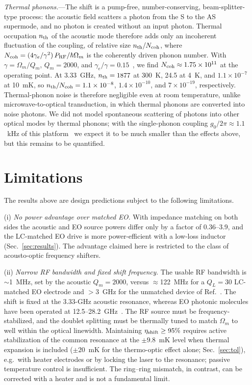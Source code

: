 \documentclass[aps,prapplied,reprint,superscriptaddress,amsmath,amssymb,floatfix]{revtex4-2}
\newcommand{\etash}{\eta_{\rm shift}}
\newcommand{\Pg}{P_{\rm RF}}
\begin{document}
\emph{Thermal phonons.}---The shift is a pump-free, number-conserving, beam-splitter-type process: the acoustic field scatters a photon from the S to the AS supermode, and no photon is created without an input photon. Thermal occupation $n_{\rm th}$ of the acoustic mode therefore adds only an incoherent fluctuation of the coupling, of relative size $n_{\rm th}/N_{\rm coh}$, where $N_{\rm coh}=(4\gamma_e/\gamma^2)\,\Pg/\hbar\Omega_m$ is the coherently driven phonon number. With $\gamma=\Omega_m/Q_m$, $Q_m=2000$, and $\gamma_e/\gamma=0.15$~\cite{Shao2019}, we find $N_{\rm coh}\approx1.75\times10^{11}$ at the operating point. At 3.33~GHz, $n_{\rm th}=1877$ at 300~K, 24.5 at 4~K, and $1.1\times10^{-7}$ at 10~mK, so $n_{\rm th}/N_{\rm coh}=1.1\times10^{-8}$, $1.4\times10^{-10}$, and $7\times10^{-19}$, respectively. Thermal-phonon noise is therefore negligible even at room temperature, unlike microwave-to-optical transduction, in which thermal phonons are converted into noise photons. We did not model spontaneous scattering of photons into other optical modes by thermal phonons; with the single-phonon coupling $g_0/2\pi\approx1.1$~kHz of this platform~\cite{Shao2019} we expect it to be much smaller than the effects above, but this remains to be quantified.

\section{Limitations}\label{sec:lim}
The results above are design predictions subject to the following limitations.

(i) \emph{No power advantage over matched EO.} With impedance matching on both sides the acoustic and EO source powers differ only by a factor of 0.36--3.9, and the LC-matched EO drive is more power-efficient with a low-loss inductor (Sec.~\ref{sec:results}). The advantage claimed here is restricted to the class of acousto-optic frequency shifters.

(ii) \emph{Narrow RF bandwidth and fixed shift frequency.} The usable RF bandwidth is $\sim$1~MHz, set by the acoustic $Q_m=2000$, versus $\approx$122~MHz for a $Q_L=30$ LC-matched EO electrode and $>$3~GHz for the unmatched device of Ref.~\cite{Hu2021}. The shift is fixed at the 3.33-GHz acoustic resonance, whereas EO photonic molecules have been operated at 12.5--28.2~GHz~\cite{Hu2021}. The RF source must be frequency-stabilized, and the doublet splitting must be thermally tuned to match $\Omega_m$ to well within the optical linewidth. Maintaining $\etash\ge95\%$ requires active stabilization of the common resonance at the $\pm9.8$~mK level when thermal expansion is included ($\pm20$~mK for the thermo-optic effect alone; Sec.~\ref{sec:tol}), e.g.\ with heater electrodes or by locking the laser to the resonance; passive temperature control is insufficient. The ring--ring mismatch, in contrast, can be corrected with a heater and is not a fundamental limit.
\end{document}
